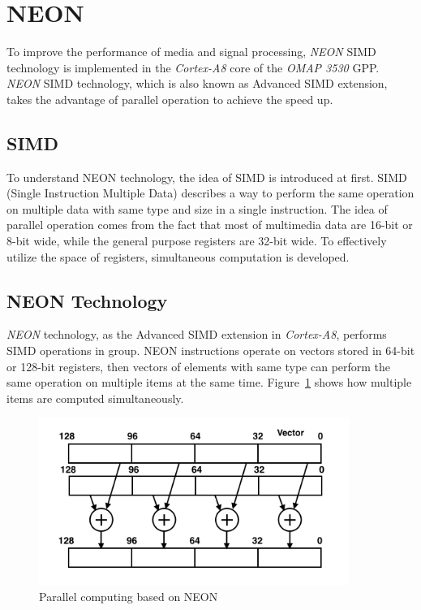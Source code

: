 \section{NEON}
To improve the performance of media and signal processing, 
\emph{NEON} SIMD technology is implemented in the \emph{Cortex-A8} core of the \emph{OMAP 3530} GPP. 
\emph{NEON} SIMD technology, which is also known as Advanced SIMD extension, 
takes the advantage of parallel operation to achieve the speed up.
\subsection{SIMD}
To understand NEON technology, the idea of SIMD is introduced at first. 
SIMD (Single Instruction Multiple Data) describes a way to perform the same operation on multiple data with same type and size in a single instruction. 
The idea of parallel operation comes from the fact that most of multimedia data are 16-bit or 8-bit wide, while the general purpose registers are 32-bit wide. 
To effectively utilize the space of registers, simultaneous computation is developed.  
\subsection{NEON Technology} 
\emph{NEON} technology, as the Advanced SIMD extension in \emph{Cortex-A8}, performs SIMD operations in group. 
NEON instructions operate on vectors stored in 64-bit or 128-bit registers, 
then vectors of elements with same type can perform the same operation on multiple items at the same time.
Figure~\ref{fig:neon} shows how multiple items are computed simultaneously. 

\begin{figure}[h]
\centering
\includegraphics[width=0.9\textwidth]{images/neon}
\caption{Parallel computing based on NEON}
\label{fig:neon}
\end{figure}

